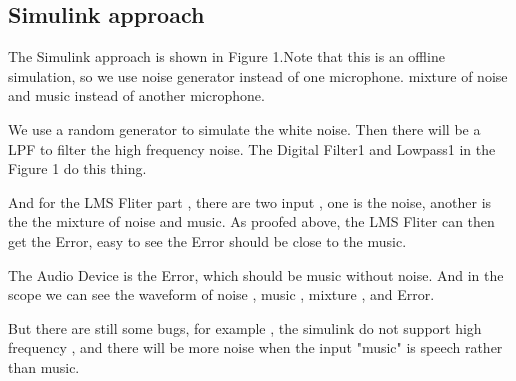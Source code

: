 \documentclass[conference,compsoc]{IEEEtran}
\begin{document}
\subsection{Simulink approach}
	The Simulink approach is shown in Figure 1.Note that this is an offline simulation, 
	so we use noise generator instead of one microphone. mixture of noise and music instead of another microphone.
\par
	We use a random generator to simulate the white noise. 
	Then there will be a LPF to filter the high frequency noise. 
	The Digital Filter1 and Lowpass1 in the Figure 1 do this thing.
\par
	And for the LMS Fliter part , there are two input , one is the noise,
	another is the the mixture of noise and music. As proofed above,
	the LMS Fliter can then get the Error, easy to see the Error should be close to the music.
\par
	The Audio Device is the Error, which should be music without noise. 
	And in the scope we can see the waveform of noise , music , mixture , and Error.
\par
	But there are still some bugs, for example , the simulink do not support high frequency , 
	and there will be more noise when the input "music" is speech rather than music.
\end{document}
